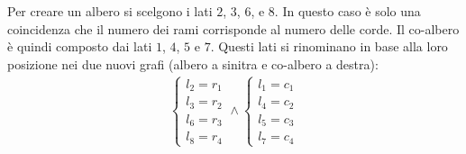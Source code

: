 \documentclass{article}
\numberwithin{equation}{subsection}
\begin{document}
Per creare un albero si scelgono i lati $2$, $3$, $6$, e $8$. In questo caso è solo una coincidenza che il numero dei rami corrisponde al numero delle corde. Il co-albero 
è quindi composto dai lati $1$, $4$, $5$ e $7$. Questi lati si rinominano in base alla loro posizione nei due nuovi grafi (albero a sinitra e co-albero a destra):
\begin{gather*}
    \begin{cases}
        l_2=r_1\\
        l_3=r_2\\
        l_6=r_3\\
        l_8=r_4
    \end{cases}\land
    \begin{cases}
        l_1=c_1\\
        l_4=c_2\\
        l_5=c_3\\
        l_7=c_4
    \end{cases}
\end{gather*}
\end{document}
